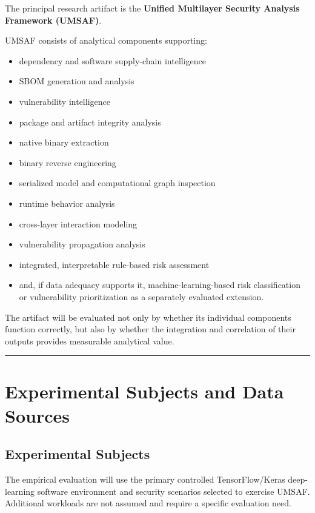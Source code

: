 \documentclass[
  12pt,
  letterpaper,
  oneside]{report}
\providecommand{\tightlist}{%
  \setlength{\itemsep}{0pt}\setlength{\parskip}{0pt}}
\begin{document}
The principal research artifact is the \textbf{Unified Multilayer
Security Analysis Framework (UMSAF)}.

UMSAF consists of analytical components supporting:

\begin{itemize}
\tightlist
\item
  dependency and software supply-chain intelligence
\item
  SBOM generation and analysis
\item
  vulnerability intelligence
\item
  package and artifact integrity analysis
\item
  native binary extraction
\item
  binary reverse engineering
\item
  serialized model and computational graph inspection
\item
  runtime behavior analysis
\item
  cross-layer interaction modeling
\item
  vulnerability propagation analysis
\item
  integrated, interpretable rule-based risk assessment
\item
  and, if data adequacy supports it, machine-learning-based risk
  classification or vulnerability prioritization as a separately
  evaluated extension.
\end{itemize}

The artifact will be evaluated not only by whether its individual
components function correctly, but also by whether the integration and
correlation of their outputs provides measurable analytical value.

\begin{center}\rule{0.5\linewidth}{0.5pt}\end{center}

\section{Experimental Subjects and Data Sources}\label{113-experimental-subjects-and-data-sources}

\subsection{Experimental Subjects}\label{1131-experimental-subjects}

The empirical evaluation will use the primary controlled
TensorFlow/Keras deep-learning software environment and security
scenarios selected to exercise UMSAF. Additional workloads are not
assumed and require a specific evaluation need.
\end{document}
